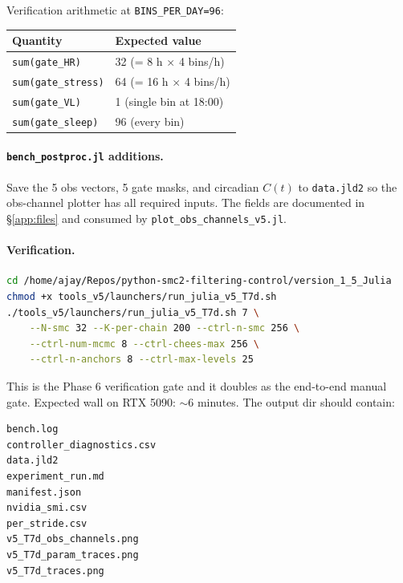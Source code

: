 \documentclass[11pt,a4paper]{article}
\begin{document}
Verification arithmetic at \texttt{BINS\_PER\_DAY=96}:

\begin{center}\footnotesize
\begin{tabular}{ll}
\toprule
Quantity & Expected value \\
\midrule
\texttt{sum(gate\_HR)}     & 32 (= 8 h $\times$ 4 bins/h) \\
\texttt{sum(gate\_stress)} & 64 (= 16 h $\times$ 4 bins/h) \\
\texttt{sum(gate\_VL)}     & 1 (single bin at 18:00) \\
\texttt{sum(gate\_sleep)}  & 96 (every bin) \\
\bottomrule
\end{tabular}
\end{center}

\paragraph{\texttt{bench\_postproc.jl} additions.} Save the 5 obs
vectors, 5 gate masks, and circadian $C(t)$ to \texttt{data.jld2}
so the obs-channel plotter has all required inputs. The fields are
documented in \S\ref{app:files} and consumed by
\texttt{plot\_obs\_channels\_v5.jl}.

\paragraph{Verification.}

\begin{lstlisting}[language=bash]
cd /home/ajay/Repos/python-smc2-filtering-control/version_1_5_Julia
chmod +x tools_v5/launchers/run_julia_v5_T7d.sh
./tools_v5/launchers/run_julia_v5_T7d.sh 7 \
    --N-smc 32 --K-per-chain 200 --ctrl-n-smc 256 \
    --ctrl-num-mcmc 8 --ctrl-chees-max 256 \
    --ctrl-n-anchors 8 --ctrl-max-levels 25
\end{lstlisting}

This is the Phase 6 verification gate and it doubles as the
end-to-end manual gate. Expected wall on RTX 5090: $\sim 6$
minutes. The output dir
should contain:

\begin{lstlisting}[language=bash]
bench.log
controller_diagnostics.csv
data.jld2
experiment_run.md
manifest.json
nvidia_smi.csv
per_stride.csv
v5_T7d_obs_channels.png
v5_T7d_param_traces.png
v5_T7d_traces.png
\end{lstlisting}
\end{document}
